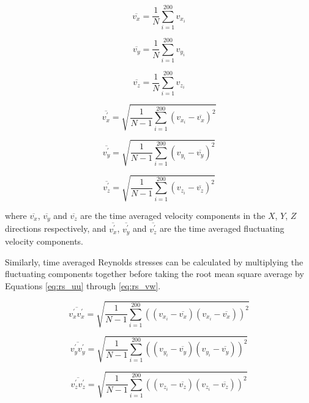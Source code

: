 \begin{equation}
\overline{v_x}  = \frac{1}{N} \sum_{i=1}^{200} v_{x_i}
\label{eq:ubar}
\end{equation}

\begin{equation}
\overline{v_y}  = \frac{1}{N} \sum_{i=1}^{200} v_{y_i}
\end{equation}

\begin{equation}
\overline{v_z}  = \frac{1}{N} \sum_{i=1}^{200} v_{z_i}
\end{equation}

\begin{equation}
\overline{v_x^\prime} = \sqrt{\frac{1}{N-1} \sum_{i=1}^{200} (v_{x_i} - 
\overline{v_x})^2}
\end{equation}

\begin{equation}
\overline{v_y^\prime} = \sqrt{\frac{1}{N-1} \sum_{i=1}^{200} (v_{y_i} - 
	\overline{v_y})^2}
\end{equation}

\begin{equation}
\overline{v_z^\prime} = \sqrt{\frac{1}{N-1} \sum_{i=1}^{200} (v_{z_i} - 
	\overline{v_z})^2}
\label{eq:wprime}
\end{equation}

where $\overline{v_x}$, $\overline{v_y}$ and $\overline{v_z}$ are the time 
averaged velocity 
components in the $X$, $Y$, $Z$ directions respectively, and  
$\overline{v_x^\prime}$, $\overline{v_y^\prime}$ and $\overline{v_z^\prime}$ 
are the time averaged fluctuating velocity components.

Similarly, time averaged Reynolds stresses can be calculated by multiplying the 
fluctuating components together before taking the root mean square average by 
Equations \ref{eq:rs_uu} through \ref{eq:rs_vw}.

\begin{equation}
\overline{v_x^\prime v_x^\prime} = \sqrt{\frac{1}{N-1} \sum_{i=1}^{200} 
	((v_{x_i} - \overline{v_x})(v_{x_i} - \overline{v_x}))^2}
\label{eq:rs_uu}
\end{equation}

\begin{equation}
\overline{v_y^\prime v_y^\prime} = \sqrt{\frac{1}{N-1} \sum_{i=1}^{200} 
	((v_{y_i} - \overline{v_y})(v_{y_i} - \overline{v_y}))^2}
\end{equation}

\begin{equation}
\overline{v_z^\prime v_z^\prime} = \sqrt{\frac{1}{N-1} \sum_{i=1}^{200} 
	((v_{z_i} - \overline{v_z})(v_{z_i} - \overline{v_z}))^2}
\end{equation}

